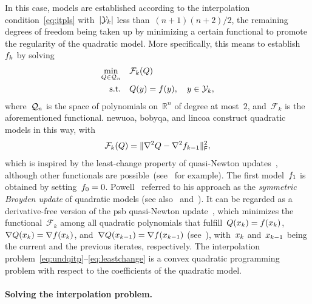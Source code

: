 \documentclass[
    smallextended,  %
    final,        %
]{svjour3}
\newcommand{\R}{\mathbb{R}}
\newcommand{\abs}[2][]{#1\lvert#2#1\rvert}
\newcommand{\frob}{\mathsf{F}}
\newcommand{\func}{\mathcal{F}}
\newcommand{\iter}[1][k]{x\ifthenelse{\equal{#1}{}}{}{_{#1}}}
\newcommand{\norm}[2][]{#1\lVert#2#1\rVert}
\newcommand{\objm}[1][k]{\obj\ifthenelse{\equal{#1}{}}{}{_{#1}}}
\newcommand{\obj}{f}
\newcommand{\qspace}[1][n]{\mathcal{Q}\ifthenelse{\equal{#1}{}}{}{_{#1}}}
\newcommand{\st}{\text{s.t.}}
\newcommand{\xpt}[1][k]{\mathcal{Y}\ifthenelse{\equal{#1}{}}{}{_{#1}}}
\begin{document}
In this case, models are established according to the interpolation condition~\eqref{eq:itpls} with~$\abs{\xpt}$ less than~$(n + 1)(n + 2) / 2$, the remaining degrees of freedom being taken up by minimizing a certain functional to promote the regularity of the quadratic model.
More specifically, this means to establish~$\objm$ by solving
\begin{equation}
    \label{eq:undqitp}
    \begin{split}
        \min_{Q \in \qspace}    & \quad \func_k(Q) \\
        \st                     & \quad Q(y) = \obj(y), \quad y \in \xpt,
    \end{split}
\end{equation}
where~$\qspace$ is the space of polynomials on~$\R^n$ of degree at most~$2$, and~$\func_k$ is the aforementioned functional.
\Gls{newuoa}, \gls{bobyqa}, and \gls{lincoa} construct quadratic models in this way, with
\begin{equation}
    \label{eq:leastchange}
    \func_k(Q) = \norm{\nabla^2 Q - \nabla^2 \objm[k - 1]}_{\frob}^2,
\end{equation}
which is inspired by the least-change property of quasi-Newton updates~\cite{Dennis_Schnabel_1979}, although other functionals are possible~(see~\cite{Conn_Toint_1996,Bandeira_Scheinberg_Vicente_2012,Powell_2013,Zhang_2014} for example).
The first model~$\objm[1]$ is obtained by setting~$\objm[0] = 0$.
Powell~\cite{Powell_2013} referred to his approach as the \emph{symmetric Broyden update} of
quadratic models (see also~\cite[\S~3.6]{Zhang_2012} and~\cite[\S~2.4.2]{Ragonneau_2022}).
It can be regarded as a derivative-free version of the \gls{psb} quasi-Newton update~\cite{Powell_1970b}, which minimizes the functional~$\func_k$ among all quadratic polynomials that fulfill~$Q(\iter) = \obj(\iter)$, $\nabla Q(\iter) = \nabla \obj(\iter)$, and~$\nabla Q(\iter[k - 1]) = \nabla \obj(\iter[k - 1])$ (see~\cite[Theorem~4.2]{Dennis_Schnabel_1979}), with~$\iter$ and~$\iter[k - 1]$ being the current and the previous iterates, respectively.
The interpolation problem~\mbox{\eqref{eq:undqitp}--\eqref{eq:leastchange}} is a convex quadratic
programming problem with respect to the coefficients of the quadratic model.

\paragraph{\textnormal{\textbf{Solving the interpolation problem.}}}
\end{document}
